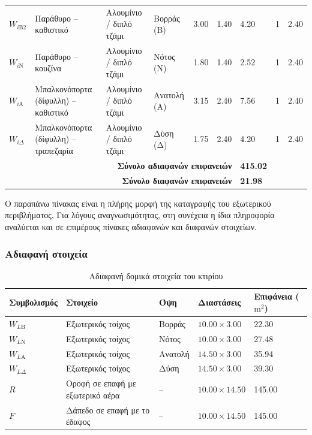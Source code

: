 \documentclass[12pt,a4paper]{article}
\begin{document}
\begin{table}[H]
{\begin{tabular}{p{1.9cm}p{2.8cm}p{4.2cm}p{2.3cm}p{2.2cm}p{1.5cm}p{1.8cm}p{1.7cm}p{2.0cm}}
\(W_{i\mathrm{B}2}\) & Παράθυρο -- καθιστικό & Αλουμίνιο / διπλό τζάμι & Βορράς (Β) & 3.00 & 1.40 & 4.20 & 1 & 2.40 \\
\(W_{i\mathrm{N}}\) & Παράθυρο -- κουζίνα & Αλουμίνιο / διπλό τζάμι & Νότος (Ν) & 1.80 & 1.40 & 2.52 & 1 & 2.40 \\
\(W_{i\mathrm{A}}\) & Μπαλκονόπορτα (δίφυλλη) -- καθιστικό & Αλουμίνιο / διπλό τζάμι & Ανατολή (Α) & 3.15 & 2.40 & 7.56 & 1 & 2.40 \\
\(W_{i\Delta}\) & Μπαλκονόπορτα (δίφυλλη) -- τραπεζαρία & Αλουμίνιο / διπλό τζάμι & Δύση (Δ) & 1.75 & 2.40 & 4.20 & 1 & 2.40 \\
\midrule
\multicolumn{6}{r}{\textbf{Σύνολο αδιαφανών επιφανειών}} & \textbf{415.02} & \multicolumn{2}{l}{} \\
\multicolumn{6}{r}{\textbf{Σύνολο διαφανών επιφανειών}} & \textbf{21.98} & \multicolumn{2}{l}{} \\
\bottomrule
\end{tabular}%
}
\end{table}

\noindent Ο παραπάνω πίνακας είναι η πλήρης μορφή της καταγραφής του εξωτερικού
περιβλήματος. Για λόγους αναγνωσιμότητας, στη συνέχεια η ίδια πληροφορία αναλύεται
και σε επιμέρους πίνακες αδιαφανών και διαφανών στοιχείων.

\subsubsection{Αδιαφανή στοιχεία}

\begin{table}[H]
\centering
\small
\caption{Αδιαφανή δομικά στοιχεία του κτιρίου}
\begin{tabularx}{\textwidth}{C{2.6cm} L C{2.2cm} C{3.0cm} C{2.4cm}}
\toprule
\textbf{Συμβολισμός} & \textbf{Στοιχείο} & \textbf{Όψη} & \textbf{Διαστάσεις} & \textbf{Επιφάνεια (\(\mathrm{m^2}\))} \\
\midrule
\(W_{L\mathrm{B}}\) & Εξωτερικός τοίχος & Βορράς & \(10.00 \times 3.00\) & 22.30 \\
\(W_{L\mathrm{N}}\) & Εξωτερικός τοίχος & Νότος & \(10.00 \times 3.00\) & 27.48 \\
\(W_{L\mathrm{A}}\) & Εξωτερικός τοίχος & Ανατολή & \(14.50 \times 3.00\) & 35.94 \\
\(W_{L\Delta}\) & Εξωτερικός τοίχος & Δύση & \(14.50 \times 3.00\) & 39.30 \\
\(R\) & Οροφή σε επαφή με εξωτερικό αέρα & -- & \(10.00 \times 14.50\) & 145.00 \\
\(F\) & Δάπεδο σε επαφή με το έδαφος & -- & \(10.00 \times 14.50\) & 145.00 \\
\bottomrule
\end{tabularx}
\end{table}
\end{document}
